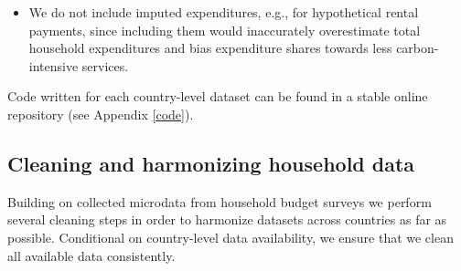 \documentclass[12pt, a4paper]{article}
\begin{document}
\begin{refsection}
\begin{itemize}
    \item We do not include imputed expenditures, e.g., for hypothetical rental payments, since including them would inaccurately overestimate total household expenditures and bias expenditure shares towards less carbon-intensive services.
\end{itemize}

Code written for each country-level dataset can be found in a stable online repository (see Appendix \ref{code}).

\subsection{Cleaning and harmonizing household data}

Building on collected microdata from household budget surveys we perform several cleaning steps in order to harmonize datasets across countries as far as possible. Conditional on country-level data availability, we ensure that we clean all available data consistently. 


\end{refsection}
\end{document}
